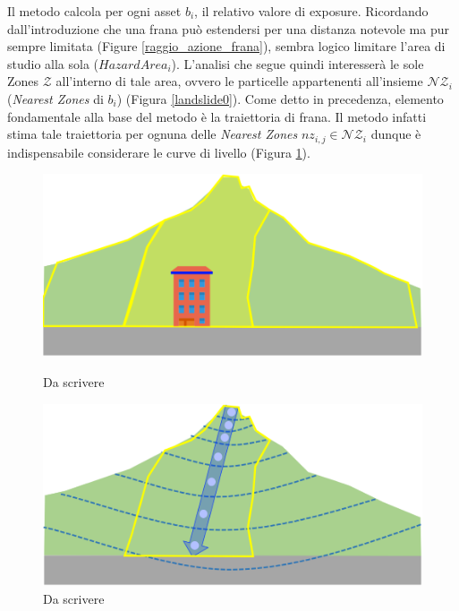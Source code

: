 Il metodo calcola per ogni asset $b_i$, il relativo valore di exposure. Ricordando dall'introduzione che una frana può estendersi per una distanza notevole ma pur sempre limitata (Figure \ref{raggio_azione_frana}), sembra logico limitare l'area di studio alla sola ($HazardArea_i$). L'analisi che segue quindi interesserà le sole Zones $\mathcal{Z}$ all'interno di tale area, ovvero le particelle appartenenti all'insieme $\mathcal{NZ}_i$ (\textit{Nearest Zones} di $b_i$) (Figura \ref{landslide0}).
Come detto in precedenza, elemento fondamentale alla base del metodo è la  traiettoria di frana. Il metodo infatti stima tale traiettoria per ognuna delle \textit{Nearest Zones} $nz_{i,j} \in \mathcal{NZ}_i$ dunque è indispensabile considerare le curve di livello  (Figura \ref{landslide1}). 

\begin{figure}[h]
	\hspace{0.05\linewidth}
	\begin{minipage}[t]{0.4\linewidth}
		\centering
		\includegraphics[width=\textwidth]{images/landslide0}
		\caption{Da scrivere}
		\label{landslide0}
	\end{minipage}
	\hspace{0.05\linewidth}
	\begin{minipage}[t]{0.4\linewidth}
		\centering
		\includegraphics[width=\textwidth]{images/landslide1}
		\caption{Da scrivere}
		\label{landslide1}
	\end{minipage}
\end{figure}

